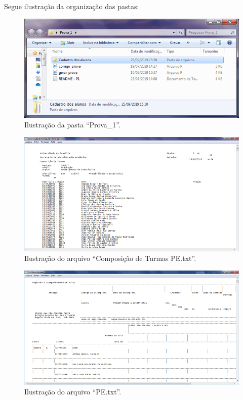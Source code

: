 \documentclass[a4paper]{report}
\begin{document}
Segue ilustração da organização das pastas:

\begin{figure}
\centering
\includegraphics{imagens/pasta_prova1.png}
\caption{Ilustração da pasta ``Prova\_1''.}
\end{figure}

\begin{figure}
\centering
\includegraphics{imagens/arquivo_compturmas.png}
\caption{Ilustração do arquivo ``Composição de Turmas PE.txt''.}
\end{figure}

\begin{figure}
\centering
\includegraphics{imagens/pe.png}
\caption{Ilustração do arquivo ``PE.txt''.}
\end{figure}
\end{document}
